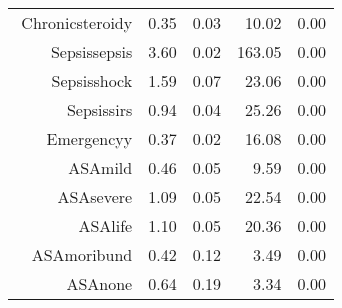 \begin{tabular}{rrrrr}
$$  Chronic\-steroid\-y & 0.35 & 0.03 & 10.02 & 0.00 \\ 
  Sepsis\-sepsis & 3.60 & 0.02 & 163.05 & 0.00 \\ 
  Sepsis\-shock & 1.59 & 0.07 & 23.06 & 0.00 \\ 
  Sepsis\-sirs & 0.94 & 0.04 & 25.26 & 0.00 \\ 
  Emergency\-y & 0.37 & 0.02 & 16.08 & 0.00 \\ 
  ASA\-mild & 0.46 & 0.05 & 9.59 & 0.00 \\ 
  ASA\-severe & 1.09 & 0.05 & 22.54 & 0.00 \\ 
  ASA\-life & 1.10 & 0.05 & 20.36 & 0.00 \\ 
  ASA\-moribund & 0.42 & 0.12 & 3.49 & 0.00 \\ 
  ASA\-none & 0.64 & 0.19 & 3.34 & 0.00 \\ 
   \hline
\end{tabular}

